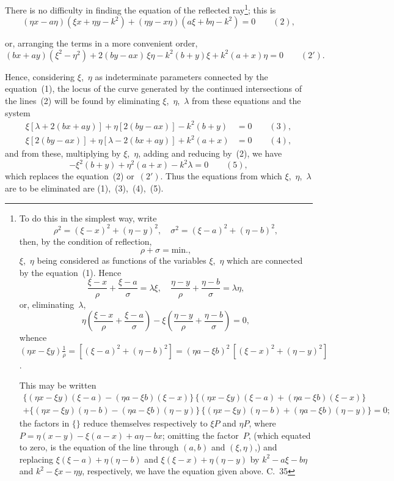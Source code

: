 \documentclass[11pt,a4paper]{book}
\begin{document}
There is no difficulty in finding the equation of the reflected ray\footnote{To do this in the simplest way, write
\[
\rho^2 = (\xi-x)^2 + (\eta-y)^2, \quad \sigma^2 = (\xi-a)^2 + (\eta-b)^2,
\]
then, by the condition of reflection,
\[
\rho + \sigma = \text{min.},
\]
$\xi$,~$\eta$ being considered as functions of the variables $\xi$,~$\eta$ which are connected by the equation~(1). Hence
\[
\frac{\xi-x}{\rho} + \frac{\xi-a}{\sigma} = \lambda\xi, \quad \frac{\eta-y}{\rho} + \frac{\eta-b}{\sigma} = \lambda\eta,
\]
or, eliminating~$\lambda$,
\[
\eta\left(\frac{\xi-x}{\rho} + \frac{\xi-a}{\sigma}\right) - \xi\left(\frac{\eta-y}{\rho} + \frac{\eta-b}{\sigma}\right) = 0,
\]
whence $(\eta x - \xi y)\frac{1}{\rho} = [(\xi-a)^2 + (\eta-b)^2] = (\eta a - \xi b)^2 \, [(\xi-x)^2 + (\eta-y)^2]$.

This may be written
\begin{multline*}
\{(\eta x - \xi y)(\xi-a) - (\eta a - \xi b)(\xi-x)\} \, \{ (\eta x - \xi y)(\xi-a) + (\eta a - \xi b)(\xi-x) \} \\
+ \{ (\eta x - \xi y)(\eta-b) - (\eta a - \xi b)(\eta-y) \} \, \{ (\eta x - \xi y)(\eta-b) + (\eta a - \xi b)(\eta-y) \} = 0;
\end{multline*}
the factors in $\{\}$ reduce themselves respectively to $\xi P$ and $\eta P$, where $P = \eta(x-y) - \xi(a-x) + a\eta - bx$; omitting the factor~$P$, (which equated to zero, is the equation of the line through $(a,b)$ and $(\xi,\eta)$,) and replacing $\xi(\xi-a) + \eta(\eta-b)$ and $\xi(\xi-x) + \eta(\eta-y)$ by $k^2 - a\xi - b\eta$ and $k^2 - \xi x - \eta y$, respectively, we have the equation given above. C.~35}; this is
\[
(\eta x - a\eta)(\xi x + \eta y - k^2) + (\eta y - x\eta)(a\xi + b\eta - k^2) = 0 \qquad(2),
\]

\newpage
or, arranging the terms in a more convenient order,
\[
(bx + ay)(\xi^2 - \eta^2) + 2(by - ax)\,\xi\eta - k^2(b+y)\xi + k^2(a+x)\eta = 0 \qquad(2').
\]

Hence, considering $\xi$,~$\eta$ as indeterminate parameters connected by the equation~(1), the locus of the curve generated by the continued intersections of the lines~(2) will be found by eliminating $\xi$,~$\eta$,~$\lambda$ from these equations and the system
\begin{align*}
\xi[\lambda + 2(bx+ay)] + \eta[2(by-ax)] - k^2(b+y) &= 0 \qquad(3),\\
\xi[2(by-ax)] + \eta[\lambda - 2(bx+ay)] + k^2(a+x) &= 0 \qquad(4),
\end{align*}
and from these, multiplying by $\xi$,~$\eta$, adding and reducing by~(2), we have
\[
-\xi^2(b+y) + \eta^2(a+x) - k^2\lambda = 0 \qquad(5),
\]
which replaces the equation~(2) or~$(2')$. Thus the equations from which $\xi$,~$\eta$,~$\lambda$ are to be eliminated are (1),~(3),~(4),~(5).
\end{document}
